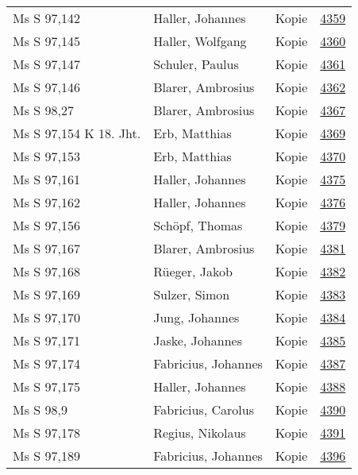\documentclass[10pt,a4paper,landscape]{report}
\begin{document}
\begin{longtable}{p{16cm}p{4cm}lr}
Ms S 97,142	&	Haller, Johannes	&	Kopie	&	\href{http://130.60.24.72/assignment/4359}{4359}\\
Ms S 97,145	&	Haller, Wolfgang	&	Kopie	&	\href{http://130.60.24.72/assignment/4360}{4360}\\
Ms S 97,147	&	Schuler, Paulus	&	Kopie	&	\href{http://130.60.24.72/assignment/4361}{4361}\\
Ms S 97,146	&	Blarer, Ambrosius	&	Kopie	&	\href{http://130.60.24.72/assignment/4362}{4362}\\
Ms S 98,27	&	Blarer, Ambrosius	&	Kopie	&	\href{http://130.60.24.72/assignment/4367}{4367}\\
Ms S 97,154  K 18. Jht.	&	Erb, Matthias	&	Kopie	&	\href{http://130.60.24.72/assignment/4369}{4369}\\
Ms S 97,153	&	Erb, Matthias	&	Kopie	&	\href{http://130.60.24.72/assignment/4370}{4370}\\
Ms S 97,161	&	Haller, Johannes	&	Kopie	&	\href{http://130.60.24.72/assignment/4375}{4375}\\
Ms S 97,162	&	Haller, Johannes	&	Kopie	&	\href{http://130.60.24.72/assignment/4376}{4376}\\
Ms S 97,156	&	Schöpf, Thomas	&	Kopie	&	\href{http://130.60.24.72/assignment/4379}{4379}\\
Ms S 97,167	&	Blarer, Ambrosius	&	Kopie	&	\href{http://130.60.24.72/assignment/4381}{4381}\\
Ms S 97,168	&	Rüeger, Jakob	&	Kopie	&	\href{http://130.60.24.72/assignment/4382}{4382}\\
Ms S 97,169	&	Sulzer, Simon	&	Kopie	&	\href{http://130.60.24.72/assignment/4383}{4383}\\
Ms S 97,170	&	Jung, Johannes	&	Kopie	&	\href{http://130.60.24.72/assignment/4384}{4384}\\
Ms S 97,171	&	Jaske, Johannes	&	Kopie	&	\href{http://130.60.24.72/assignment/4385}{4385}\\
Ms S 97,174	&	Fabricius, Johannes	&	Kopie	&	\href{http://130.60.24.72/assignment/4387}{4387}\\
Ms S 97,175	&	Haller, Johannes	&	Kopie	&	\href{http://130.60.24.72/assignment/4388}{4388}\\
Ms S 98,9	&	Fabricius, Carolus	&	Kopie	&	\href{http://130.60.24.72/assignment/4390}{4390}\\
Ms S 97,178	&	Regius, Nikolaus	&	Kopie	&	\href{http://130.60.24.72/assignment/4391}{4391}\\
Ms S 97,189	&	Fabricius, Johannes	&	Kopie	&	\href{http://130.60.24.72/assignment/4396}{4396}\\

\end{longtable}
\end{document}
